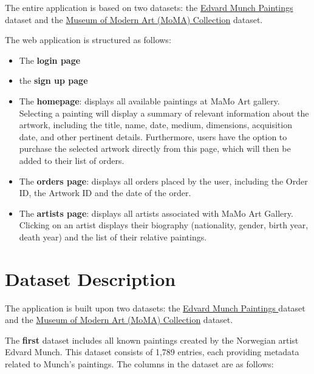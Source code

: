 \documentclass[a4paper,12pt]{article}
\begin{document}
The entire application is based on two datasets: the \href{https://www.kaggle.com/datasets/isaienkov/edvard-munch-paintings}{Edvard Munch Paintings } dataset and the \href{https://www.kaggle.com/datasets/momanyc/museum-collection?select=artworks.csv}{Museum of Modern Art (MoMA) Collection} dataset.

The web application is structured as follows:

\begin{itemize}
      \item The \textbf{login page}
      \item the \textbf{sign up page}

      \item The \textbf{homepage}: displays all available paintings at MaMo Art gallery. Selecting a painting will display a summary of relevant information about the artwork, including the title, name, date, medium, dimensions, acquisition date, and other pertinent details. Furthermore, users have the option to purchase the selected artwork directly from this page, which will then be added to their list of orders.

      \item The \textbf{orders page}: displays all orders placed by the user, including the Order ID, the Artwork ID and the date of the order.

      \item The \textbf{artists page}:  displays all artists associated with MaMo Art Gallery. Clicking on an artist displays their biography (nationality, gender, birth year, death year) and the list of their relative paintings.

\end{itemize}

\newpage
\section{Dataset Description}
\justify

The application is built upon two datasets: the \href{https://www.kaggle.com/datasets/isaienkov/edvard-munch-paintings}{Edvard Munch Paintings } dataset and the \href{https://www.kaggle.com/datasets/momanyc/museum-collection?select=artworks.csv}{Museum of Modern Art (MoMA) Collection} dataset.


The \textbf{first} dataset includes all known paintings created by the Norwegian artist Edvard Munch. This dataset consists of 1,789 entries, each providing metadata related to Munch's paintings. The columns in the dataset are as follows:
\end{document}
